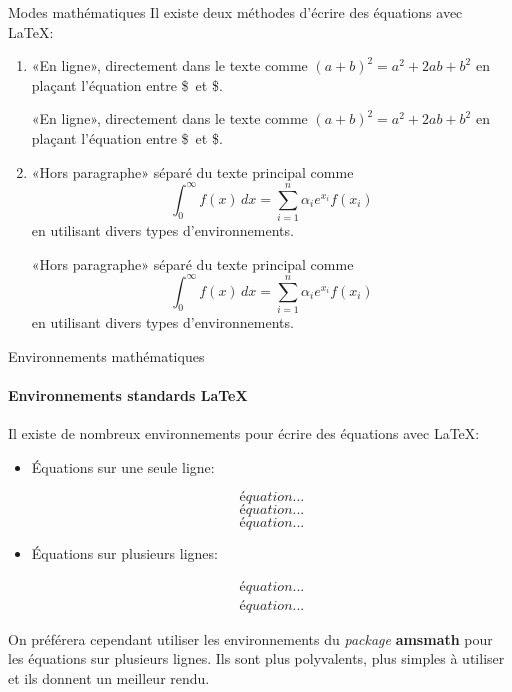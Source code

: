 \begin{frame}[fragile]{Modes mathématiques}
	Il existe deux méthodes d'écrire des équations avec \LaTeX:
	
	\begin{enumerate}
		\item «En ligne», directement dans le texte comme $(a + b)^2 = a^2 + 2ab + b^2$ en
		plaçant l'équation entre \$\ et \$.
\begin{codesource}
	«En ligne», directement dans le texte comme $(a + b)^2 = a^2 + 2ab + b^2$ en
	plaçant l'équation entre \$\ et \$.
\end{codesource}
		\item «Hors paragraphe» séparé du texte principal comme
			\begin{equation*}
				\int_0^\infty f(x)\, dx =
				\sum_{i = 1}^n \alpha_i e^{x_i} f(x_i)
			\end{equation*}
			en utilisant divers types d'environnements.
\begin{codesource}
	«Hors paragraphe» séparé du texte principal comme
	\begin{equation*}
		\int_0^\infty f(x)\, dx =
		\sum_{i = 1}^n \alpha_i e^{x_i} f(x_i)
	\end{equation*}
	en utilisant divers types d'environnements.
\end{codesource}
	\end{enumerate}
\end{frame}


\begin{frame}[fragile,c]{Environnements mathématiques}
	\framesubtitle{Environnements standards \LaTeX}
	Il existe de nombreux environnements pour écrire des équations avec \LaTeX:
	\begin{itemize}
		\item Équations sur une seule ligne:
\begin{codesource}
	\begin{displaymath} équation...	\end{displaymath}
	\begin{equation} équation... \end{equation}
	\begin{equation*} équation... \end{equation*}
\end{codesource}
		\item Équations sur plusieurs lignes:
\begin{codesource}
	\begin{eqnarray} équation...  \end{eqnarray}
	\begin{eqnarray*} équation... \end{eqnarray*}
\end{codesource}
	\end{itemize}

	\pause
	On préférera cependant utiliser les environnements du \emph{package} \textbf{amsmath} pour les équations sur plusieurs lignes. Ils sont plus polyvalents, plus simples à utiliser et ils donnent un meilleur rendu.
\end{frame}

